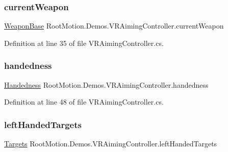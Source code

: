 \subsubsection{\texorpdfstring{current\+Weapon}{currentWeapon}}
{\footnotesize\ttfamily \mbox{\hyperlink{class_root_motion_1_1_demos_1_1_weapon_base}{Weapon\+Base}} Root\+Motion.\+Demos.\+V\+R\+Aiming\+Controller.\+current\+Weapon}



Definition at line 35 of file V\+R\+Aiming\+Controller.\+cs.

\mbox{\label{class_root_motion_1_1_demos_1_1_v_r_aiming_controller_aaf70e369f4b6afc75b0d2fd39b7cd151}} 
\subsubsection{\texorpdfstring{handedness}{handedness}}
{\footnotesize\ttfamily \mbox{\hyperlink{class_root_motion_1_1_demos_1_1_v_r_aiming_controller_ab88bf3b4946db8022f1a2049e3fc9399}{Handedness}} Root\+Motion.\+Demos.\+V\+R\+Aiming\+Controller.\+handedness}



Definition at line 48 of file V\+R\+Aiming\+Controller.\+cs.

\mbox{\label{class_root_motion_1_1_demos_1_1_v_r_aiming_controller_ae4024252e08d42e68c70c95eabc83f1a}} 
\subsubsection{\texorpdfstring{left\+Handed\+Targets}{leftHandedTargets}}
{\footnotesize\ttfamily \mbox{\hyperlink{struct_root_motion_1_1_demos_1_1_v_r_aiming_controller_1_1_targets}{Targets}} Root\+Motion.\+Demos.\+V\+R\+Aiming\+Controller.\+left\+Handed\+Targets}



